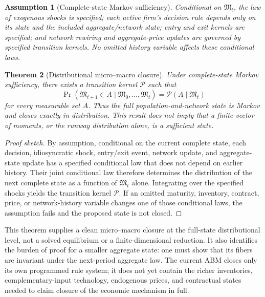 \documentclass[11pt,a4paper]{article}
\newtheorem{theorem}{Theorem}[section]\newtheorem{proposition}[theorem]{Proposition}\newtheorem{corollary}[theorem]{Corollary}\newtheorem{definition}[theorem]{Definition}\newtheorem{assumption}[theorem]{Assumption}
\begin{document}
\begin{assumption}[Complete-state Markov sufficiency]
Conditional on $\mathfrak M_t$, the law of exogenous shocks is specified; each active firm's decision rule depends only on its state and the included aggregate/network state; entry and exit kernels are specified; and network rewiring and aggregate-price updates are governed by specified transition kernels. No omitted history variable affects these conditional laws.
\end{assumption}

\begin{theorem}[Distributional micro--macro closure]
Under complete-state Markov sufficiency, there exists a transition kernel $\mathcal P$ such that
\[
\Pr(\mathfrak M_{t+1}\in A\mid\mathfrak M_0,\ldots,\mathfrak M_t)=\mathcal P(A\mid\mathfrak M_t)
\]
for every measurable set $A$. Thus the full population-and-network state is Markov and closes exactly in distribution. This result does not imply that a finite vector of moments, or the runway distribution alone, is a sufficient state.
\end{theorem}

\begin{proof}[Proof sketch]
By assumption, conditional on the current complete state, each decision, idiosyncratic shock, entry/exit event, network update, and aggregate-state update has a specified conditional law that does not depend on earlier history. Their joint conditional law therefore determines the distribution of the next complete state as a function of $\mathfrak M_t$ alone. Integrating over the specified shocks yields the transition kernel $\mathcal P$. If an omitted maturity, inventory, contract, price, or network-history variable changes one of those conditional laws, the assumption fails and the proposed state is not closed.
\end{proof}

This theorem supplies a clean micro--macro closure at the full-state distributional level, not a solved equilibrium or a finite-dimensional reduction. It also identifies the burden of proof for a smaller aggregate state: one must show that its fibers are invariant under the next-period aggregate law. The current ABM closes only its own programmed rule system; it does not yet contain the richer inventories, complementary-input technology, endogenous prices, and contractual states needed to claim closure of the economic mechanism in full.
\end{document}
